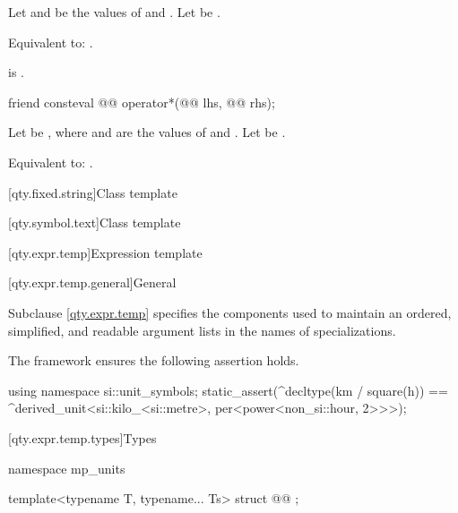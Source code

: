 \begin{itemdescr}
\pnum
Let  and  be the values of  and .
Let  be .

\pnum
\effects
Equivalent to: .

\pnum
\ensures
{} is .
\end{itemdescr}

\begin{itemdecl}
friend consteval @@ operator*(@@ lhs, @@ rhs);
\end{itemdecl}

\begin{itemdescr}
\pnum
Let  be ,
where  and  are the values of  and .
Let  be .

\pnum
\effects
Equivalent to: .
\end{itemdescr}

[qty.fixed.string]{Class template }

[qty.symbol.text]{Class template }

[qty.expr.temp]{Expression template}

[qty.expr.temp.general]{General}

\pnum
Subclause \ref{qty.expr.temp} specifies the components
used to maintain an ordered, simplified, and readable
argument lists in the names of specializations.
\begin{example}
The framework ensures the following assertion holds.
\begin{codeblock}
using namespace si::unit_symbols;
static_assert(^decltype(km / square(h)) ==
              ^derived_unit<si::kilo_<si::metre>, per<power<non_si::hour, 2>>>);
\end{codeblock}
\end{example}

[qty.expr.temp.types]{Types}

\begin{codeblock}
namespace mp_units {

template<typename T, typename... Ts>
struct @@ {};

}
\end{codeblock}


